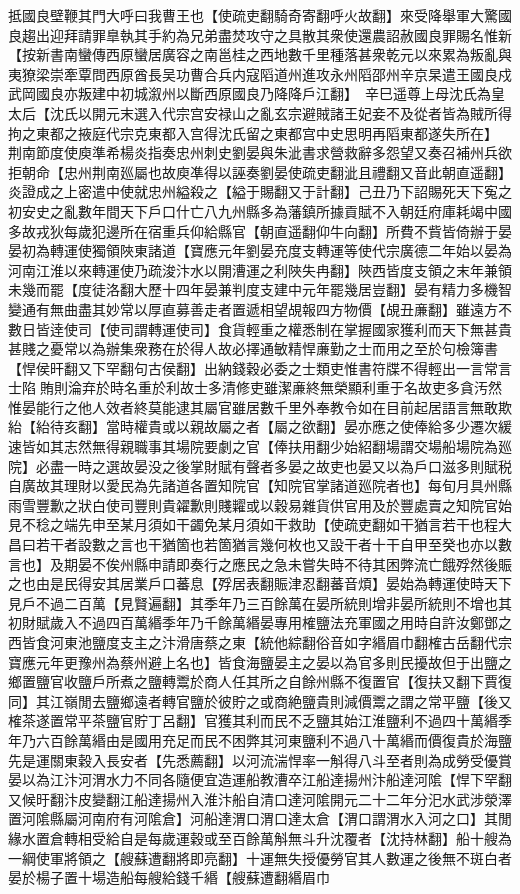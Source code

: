 抵國良壁鞭其門大呼曰我曹王也【使疏吏翻騎奇寄翻呼火故翻】來受降舉軍大驚國良趨出迎拜請罪臯執其手約為兄弟盡焚攻守之具散其衆使還農詔赦國良罪賜名惟新【按新書南蠻傳西原蠻居廣容之南邕桂之西地數千里種落甚衆乾元以來累為叛亂與夷獠梁崇牽覃問西原酋長吴功曹合兵内寇䧟道州進攻永州䧟邵州辛京杲遣王國良戍武岡國良亦叛建中初城溆州以斷西原國良乃降降戶江翻】　辛巳遥尊上母沈氏為皇太后【沈氏以開元末選入代宗宫安禄山之亂玄宗避賊諸王妃妾不及從者皆為賊所得拘之東都之掖庭代宗克東都入宫得沈氏留之東都宫中史思明再䧟東都遂失所在】　荆南節度使庾準希楊炎指奏忠州刺史劉晏與朱泚書求營救辭多怨望又奏召補州兵欲拒朝命【忠州荆南廵屬也故庾凖得以誣奏劉晏使疏吏翻泚且禮翻又音此朝直遥翻】炎證成之上密遣中使就忠州縊殺之【縊于賜翻又于計翻】己丑乃下詔賜死天下寃之初安史之亂數年間天下戶口什亡八九州縣多為藩鎮所據貢賦不入朝廷府庫耗竭中國多故戎狄每歲犯邊所在宿重兵仰給縣官【朝直遥翻仰牛向翻】所費不貲皆倚辦于晏晏初為轉運使獨領陜東諸道【寶應元年劉晏充度支轉運等使代宗廣德二年始以晏為河南江淮以來轉運使乃疏浚汴水以開漕運之利陜失冉翻】陜西皆度支領之末年兼領未幾而罷【度徒洛翻大歷十四年晏兼判度支建中元年罷幾居豈翻】晏有精力多機智變通有無曲盡其妙常以厚直募善走者置遞相望覘報四方物價【覘丑亷翻】雖遠方不數日皆逹使司【使司謂轉運使司】食貨輕重之權悉制在掌握國家獲利而天下無甚貴甚賤之憂常以為辦集衆務在於得人故必擇通敏精悍亷勤之士而用之至於句檢簿書【悍侯旰翻又下罕翻句古侯翻】出納錢穀必委之士類吏惟書符牒不得輕出一言常言士陷賄則淪弃於時名重於利故士多清修吏雖潔亷終無榮顯利重于名故吏多貪汚然惟晏能行之他人效者終莫能逮其屬官雖居數千里外奉教令如在目前起居語言無敢欺紿【紿待亥翻】當時權貴或以親故屬之者【屬之欲翻】晏亦應之使俸給多少遷次緩速皆如其志然無得親職事其場院要劇之官【俸扶用翻少始紹翻場謂交場船場院為廵院】必盡一時之選故晏没之後掌財賦有聲者多晏之故吏也晏又以為戶口滋多則賦税自廣故其理財以愛民為先諸道各置知院官【知院官掌諸道廵院者也】每旬月具州縣雨雪豐歉之狀白使司豐則貴糴歉則賤糶或以穀易雜貨供官用及於豐處賣之知院官始見不稔之端先申至某月須如干蠲免某月須如干救助【使疏吏翻如干猶言若干也程大昌曰若干者設數之言也干猶箇也若箇猶言幾何枚也又設干者十干自甲至癸也亦以數言也】及期晏不俟州縣申請即奏行之應民之急未嘗失時不待其困弊流亡餓殍然後賑之也由是民得安其居業戶口蕃息【殍居表翻賑津忍翻蕃音煩】晏始為轉運使時天下見戶不過二百萬【見賢遍翻】其季年乃三百餘萬在晏所統則增非晏所統則不增也其初財賦歲入不過四百萬緡季年乃千餘萬緡晏專用榷鹽法充軍國之用時自許汝鄭鄧之西皆食河東池鹽度支主之汴滑唐蔡之東【統他綜翻俗音如字緡眉巾翻榷古岳翻代宗寶應元年更豫州為蔡州避上名也】皆食海鹽晏主之晏以為官多則民擾故但于出鹽之鄉置鹽官收鹽戶所煮之鹽轉鬻於商人任其所之自餘州縣不復置官【復扶又翻下賈復同】其江嶺閒去鹽鄉遠者轉官鹽於彼貯之或商絶鹽貴則減價鬻之謂之常平鹽【後又榷茶遂置常平茶鹽官貯丁呂翻】官獲其利而民不乏鹽其始江淮鹽利不過四十萬緡季年乃六百餘萬緡由是國用充足而民不困弊其河東鹽利不過八十萬緡而價復貴於海鹽先是運關東穀入長安者【先悉薦翻】以河流湍悍率一斛得八斗至者則為成勞受優賞晏以為江汴河渭水力不同各隨便宜造運船教漕卒江船達揚州汴船達河隂【悍下罕翻又候旴翻汴皮變翻江船達揚州入淮汴船自清口達河隂開元二十二年分汜水武涉滎澤置河隂縣屬河南府有河隂倉】河船達渭口渭口達太倉【渭口謂渭水入河之口】其閒緣水置倉轉相受給自是每歲運穀或至百餘萬斛無斗升沈覆者【沈持林翻】船十艘為一綱使軍將領之【艘蘇遭翻將即亮翻】十運無失授優勞官其人數運之後無不斑白者晏於楊子置十場造船每艘給錢千緡【艘蘇遭翻緡眉巾